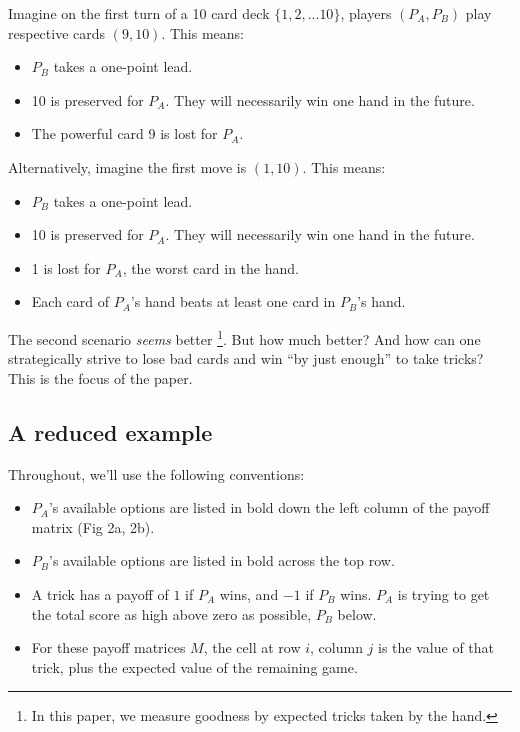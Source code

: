 \documentclass[11pt, oneside]{article} 	%
\begin{document}
Imagine on the first turn of a 10 card deck $\{1, 2, ... 10\}$, players $(P_A, P_B)$ play respective cards $(9, 10)$.  This means:
\begin{itemize}
\item $P_B$ takes a one-point lead.
\item 10 is preserved for $P_A$.  They will necessarily win one hand in the future.
\item The powerful card 9 is lost for $P_A$.
\end{itemize}

Alternatively, imagine the first move is $(1,10)$.  This means:

\begin{itemize}
\item $P_B$ takes a one-point lead.
\item 10 is preserved for $P_A$.  They will necessarily win one hand in the future.
\item 1 is lost for $P_A$, the worst card in the hand.
\item Each card of $P_A$'s hand beats at least one card in $P_B$'s hand.
\end{itemize}

The second scenario \emph{seems} better \footnote{In this paper, we measure goodness by expected tricks taken by the hand.}.  But how much better?  And how can one strategically strive to lose bad cards and win ``by just enough'' to take tricks?  This is the focus of the paper.

\subsection{A reduced example}

Throughout, we'll use the following conventions:
\begin{itemize}
\item $P_A$'s available options are listed in bold down the left column of the payoff matrix (Fig 2a, 2b).
\item $P_B$'s available options are listed in bold across the top row.
\item A trick has a payoff of $1$ if $P_A$ wins, and $-1$ if $P_B$ wins.  $P_A$ is trying to get the total score as high above zero as possible, $P_B$ below.
\item For these payoff matrices $M$, the cell at row $i$, column $j$ is the value of that trick, plus the expected value of the remaining game.
\end{itemize}
\end{document}
